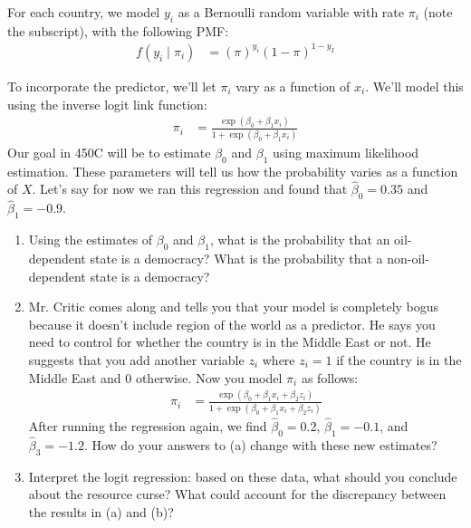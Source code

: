 \documentclass[11pt]{article}
\begin{document}
For each country, we model $y_i$ as a Bernoulli random variable with rate $\pi_i$ (note the subscript), with the following PMF:
\begin{align*}
f(y_i  \mid \pi_i) &= (\pi)^{y_i} (1 - \pi)^{1-y_I}
\end{align*}

To incorporate the predictor, we'll let $\pi_i$ vary as a function of $x_i$. We'll model this using the inverse logit link function:
\begin{align*}
	\pi_i &= \frac{\exp(\beta_0 + \beta_1 x_i)}{1 + \exp(\beta_0 +\beta_1 x_i)}
\end{align*}
Our goal in 450C will be to estimate $\beta_0$ and $\beta_1$ using maximum likelihood estimation. These parameters will tell us how the probability varies as a function of $X$. Let's say for now we ran this regression and found that $\hat\beta_0 = 0.35$ and $\hat\beta_1 = -0.9$. 

\begin{enumerate}
	\item Using the estimates of $\beta_0$ and $\beta_1$, what is the probability that an oil-dependent state is a democracy? What is the probability that a non-oil-dependent state is a democracy?
	\item Mr. Critic comes along and tells you that your model is completely bogus because it doesn't include region of the world as a predictor. He says you need to control for whether the country is in the Middle East or not. He suggests that you add another variable $z_i$ where $z_i = 1$ if the country is in the Middle East and 0 otherwise. Now you model $\pi_i$ as follows:
	\begin{align*}
	\pi_i &= \frac{\exp(\beta_0 + \beta_1 x_i + \beta_2 z_i )}{1 + \exp(\beta_0 +  \beta_1 x_i + \beta_2 z_i )}
	\end{align*}
	After running the regression again, we find $\hat{\beta}_0 = 0.2$, $\hat\beta_1 = -0.1$, and $\hat{\beta}_3 = -1.2$. How do your answers to (a) change with these new estimates? 
	\item Interpret the logit regression: based on these data, what should you conclude about the resource curse? What could account for the discrepancy between the results in (a) and (b)? 
\end{enumerate}
\end{document}
